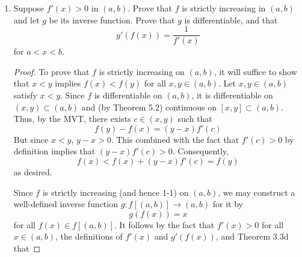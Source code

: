 \documentclass[../psets.tex]{subfiles}
\begin{document}
\begin{enumerate}[label={\textbf{\arabic*.}}]
\begin{proof}
        To prove that $f$ is constant, Theorem 5.11b tells us that it will suffice to show that $f$ is differentiable on $\R$ with derivative $f'=0$. Let $x\in\R$ be arbitrary. We want to show that for all $\epsilon>0$, there exists a $\delta$ such that if $y\in\R$ and $0<|y-x|<\delta$, then $|[f(y)-f(x)]/(y-x)-0|<\epsilon$. Let $\epsilon$ be arbitrary. Choose $\delta=\epsilon$. Then we have that
        \begin{align*}
            \left| \frac{f(y)-f(x)}{y-x}-0 \right| &= \frac{|f(y)-f(x)|}{|y-x|}\\
            &\leq \frac{(y-x)^2}{|y-x|}\\
            &\leq |y-x|\\
            &< \epsilon
        \end{align*}
        as desired.
    \end{proof}
    \item Suppose $f'(x)>0$ in $(a,b)$. Prove that $f$ is strictly increasing in $(a,b)$ and let $g$ be its inverse function. Prove that $g$ is differentiable, and that
    \begin{equation*}
        g'(f(x)) = \frac{1}{f'(x)}
    \end{equation*}
    for $a<x<b$.
    \begin{proof}
        To prove that $f$ is strictly increasing on $(a,b)$, it will suffice to show that $x<y$ implies $f(x)<f(y)$ for all $x,y\in(a,b)$. Let $x,y\in(a,b)$ satisfy $x<y$. Since $f$ is differentiable on $(a,b)$, it is differentiable on $(x,y)\subset(a,b)$ and (by Theorem 5.2) continuous on $[x,y]\subset(a,b)$. Thus, by the MVT, there exists $c\in(x,y)$ such that
        \begin{equation*}
            f(y)-f(x) = (y-x)f'(c)
        \end{equation*}
        But since $x<y$, $y-x>0$. This combined with the fact that $f'(c)>0$ by definition implies that $(y-x)f'(c)>0$. Consequently,
        \begin{equation*}
            f(x) < f(x)+(y-x)f'(c) = f(y)
        \end{equation*}
        as desired.\par
        Since $f$ is strictly increasing (and hence 1-1) on $(a,b)$, we may construct a well-defined inverse function $g:f[(a,b)]\to(a,b)$ for it by
        \begin{equation*}
            g(f(x)) = x
        \end{equation*}
        for all $f(x)\in f[(a,b)]$. It follows by the fact that $f'(x)>0$ for all $x\in(a,b)$, the definitions of $f'(x)$ and $g'(f(x))$, and Theorem 3.3d that

\end{proof}
\end{enumerate}
\end{document}

